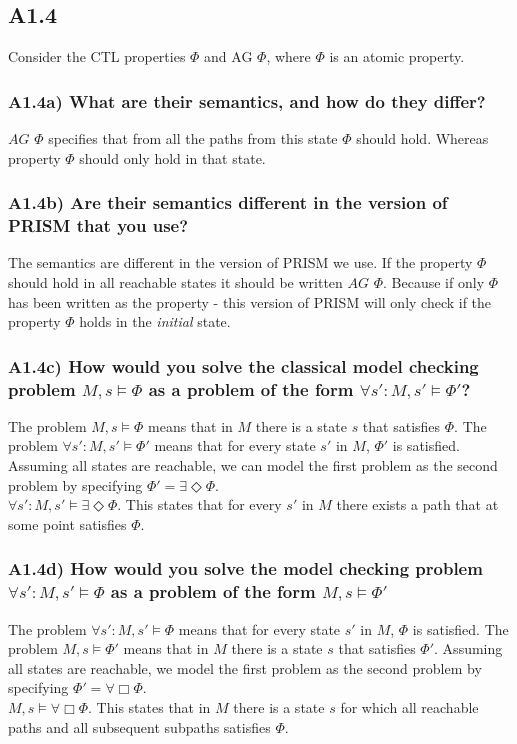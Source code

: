 \documentclass[12pt]{report}
\begin{document}
\subsection*{A1.4}
Consider the CTL properties $\Phi$ and AG $\Phi$, where $\Phi$ is an atomic property.

\subsubsection*{A1.4a) What are their semantics, and how do they differ?}
$AG$ $\Phi$ specifies that from all the paths from this state $\Phi$ should hold. Whereas property $\Phi$ should only hold in that state.

\subsubsection*{A1.4b) Are their semantics different in the version of PRISM that you use?}
The semantics are different in the version of PRISM we use. If the property $\Phi$ should hold in all reachable states it should be written $AG$ $\Phi$. Because if only $\Phi$ has been written as the property - this version of PRISM will only check if the property $\Phi$ holds in the \emph{initial} state.

\subsubsection*{A1.4c) How would you solve the classical model checking problem $M,s \models \Phi$ as a problem of the form $\forall s' : M,s' \models \Phi'$?}
The problem $M,s \models \Phi$ means that in $M$ there is a state $s$ that satisfies $\Phi$. The problem $\forall s' : M,s' \models \Phi'$ means that for every state $s'$ in $M$, $\Phi'$ is satisfied. Assuming all states are reachable, we can model the first problem as the second problem by specifying $\Phi' = \exists \Diamond \Phi$.\\
$\forall s' : M,s' \models \exists \Diamond \Phi$. This states that for every $s'$ in $M$ there exists a path that at some point satisfies $\Phi$.

\subsubsection*{A1.4d) How would you solve the model checking problem $\forall s' : M,s' \models \Phi$ as a problem of the form $M,s \models \Phi'$}
The problem $\forall s' : M,s' \models \Phi$ means that for every state $s'$ in $M$, $\Phi$ is satisfied. The problem $M,s \models \Phi'$ means that in $M$ there is a state $s$ that satisfies $\Phi'$. Assuming all states are reachable, we model the first problem as the second problem by specifying $\Phi' = \forall \Box \Phi$.\\
$M,s \models \forall \Box \Phi$. This states that in $M$ there is a state $s$ for which all reachable paths and all subsequent subpaths satisfies $\Phi$.
\end{document}
